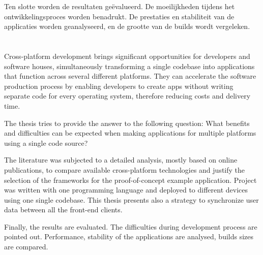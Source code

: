 {Ten slotte worden de resultaten geëvalueerd. De moeilijkheden tijdens het ontwikkelingsproces worden benadrukt. De prestaties en stabiliteit van de applicaties worden geanalyseerd, en de grootte van de builds wordt vergeleken.





}{}


\chapter*{}

Cross-platform development brings significant opportunities for developers and software houses, simultaneously transforming a single codebase into applications that function across several different platforms. They can accelerate the software production process by enabling developers to create apps without writing separate code for every operating system, therefore reducing costs and delivery time.\newline


The thesis tries to provide the answer to the following question: What benefits and difficulties can be expected when making applications for multiple platforms using a single code source?\newline


The literature was subjected to a detailed analysis, mostly based on online publications, to compare available cross-platform technologies and justify the selection of the frameworks for the proof-of-concept example application. Project was written with one programming language and deployed to different devices using one single codebase. This thesis presents also a strategy to synchronize user data between all the front-end clients.\newline


Finally, the results are evaluated. The difficulties during development process are pointed out. Performance, stability of the applications are analysed, builds sizes are compared.
